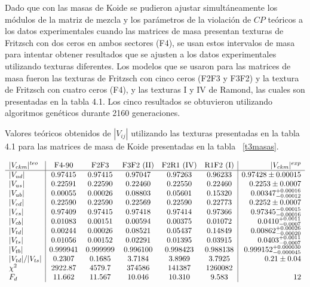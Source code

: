Dado que con las masas de Koide se pudieron ajustar simult\'aneamente los
m\'odulos de la matriz de mezcla y los par\'ametros de la violaci\'on de $CP$
te\'oricos a los datos experimentales cuando las matrices de masa presentan
texturas de Fritzsch con dos ceros en ambos sectores (F4), se usan estos
intervalos de masa para intentar obtener resultados que se ajusten a los datos
experimentales utilizando texturas diferentes. Los modelos que se usaron para
las matrices de masa fueron las texturas de Fritzsch con cinco ceros (F2F3 y
F3F2) y la textura de Fritzsch con cuatro ceros (F4), y las texturas I y IV de
Ramond, las cuales son presentadas en la tabla 4.1. Los cinco resultados se
obtuvieron utilizando algoritmos gen\'eticos durante 2160 generaciones. 

{\tiny
\begin{table}[h!]\label{trbb}
\caption{Valores te\'oricos obtenidos de $|V_{ij}|$ utilizando las texturas 
presentadas en la tabla 4.1  para las matrices de masa de Koide presentadas en 
la tabla ~\ref{t3masas}.}
$$\ba{l|ccccc|r}
|V_{ckm}|^{teo} & \mbox{F4-90} & \mbox{F2F3} & \mbox{F3F2 (II)} & 
\mbox{F2R1 (IV)} & \mbox{R1F2 (I)} & 
|V_{ckm}|^{exp}\\ \hline
|V_{ud}| & 0.97415 & 0.97415 & 0.97047 & 0.97263 & 0.96233 & 
0.97428\pm{0.00015} \\
|V_{us}| & 0.22591 & 0.22590 & 0.22460 & 0.22550 & 0.22460 & 
0.2253\pm{0.0007} \\
|V_{ub}| & 0.00055 & 0.00026 & 0.08803 & 0.05601 & 0.15320 & 
0.00347^{+0.00016}_{-0.00012} \\
|V_{cd}| & 0.22590 & 0.22590 & 0.22569 & 0.22590 & 0.22773 & 
0.2252\pm{0.0007} \\
|V_{cs}| & 0.97409 & 0.97415 & 0.97418 & 0.97414 & 0.97366 & 
0.97345^{-0.00015}_{-0.00016} \\
|V_{cb}| & 0.01083 & 0.00151 & 0.00594 & 0.00375 & 0.01072 & 
0.0410^{+0.0011}_{-0.0007} \\
|V_{td}| & 0.00244 & 0.00026 & 0.08521 & 0.05437 & 0.14849 & 
0.00862^{+0.00026}_{-0.00020} \\
|V_{ts}| & 0.01056 & 0.00152 & 0.02291 & 0.01395 & 0.03915 & 
0.0403^{+0.0011}_{-0.0007} \\
|V_{tb}| & 0.999941 & 0.999999 & 0.996100 & 0.998423 & 0.988138 & 
0.999152^{+0.000030}_{-0.000045} \\
|V_{td}|/|V_{ts}| & 0.2307 & 0.1685 & 3.7184 & 3.8969 & 3.7925 & 0.21\pm{0.04} \\
\chi^2& 2922.87 & 4579.7  & 374586  & 141387  & 1260082 \\
F_d   & 11.662  & 11.567  & 10.046  & 10.310  & 9.583   & 12 \\
\ea
$$\end{table} }
